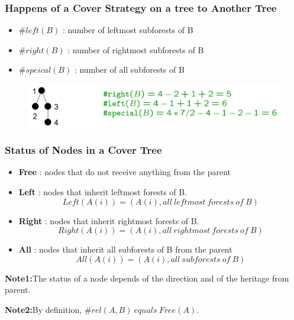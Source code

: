 \documentclass{beamer}
\begin{document}
\begin{frame}
\frametitle{Happens of a Cover Strategy on a tree to Another Tree}

\begin{itemize}
\item $\#left(B)$ : number of leftmost subforests of B 
\item $\#right(B)$ : number of rightmost subforests of B
\item $\#speical(B)$ : number of all subforests of B
\end{itemize}

\begin{figure}
	\includegraphics[width=1.0\linewidth]{exampleoflemma11}
	\label{Example of LEMMA 12} 
	\centering
\end{figure}

\end{frame}


\begin{frame}
\frametitle{Status of Nodes in a Cover Tree}

\begin{itemize}
\item \textbf{Free} : nodes that do not receive anything from the parent
\item \textbf{Left} :  nodes that inherit leftmost forests of B.
\begin{displaymath}
Left(A(i)) = (A(i), all\ leftmost\ forests\ of\ B)
\end{displaymath}
\item \textbf{Right} : nodes that inherit rightmost forests of B.
\begin{displaymath}
Right(A(i)) = (A(i), all\ rightmost\ forests\ of\ B)
\end{displaymath}
\item \textbf{All} : nodes that inherit all subforests of B from the parent
\begin{displaymath}
All(A(i)) = (A(i), all\ subforests\ of\ B)
\end{displaymath}
\end{itemize}

\textbf{Note1:}The status of a node depends of the direction and of the heritage from parent.

\textbf{Note2:}By definition, $\#rel(A, B)\ equals\ Free(A)$.
\end{frame}
\end{document}
